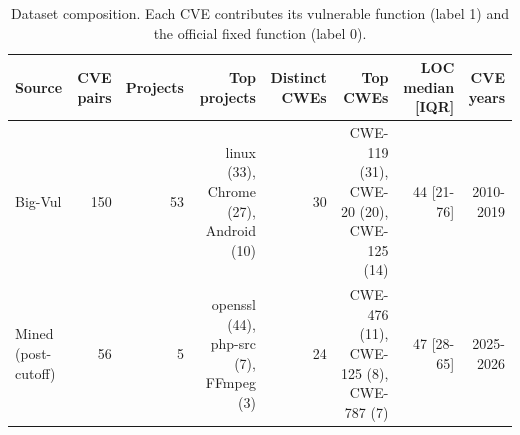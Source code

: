 \begin{table}[t]
\centering\small
\caption{Dataset composition. Each CVE contributes its vulnerable function (label 1) and the official fixed function (label 0).}
\label{tab:t1}
\begin{tabular}{lrrrrrrr}
\toprule
Source & CVE pairs & Projects & Top projects & Distinct CWEs & Top CWEs & LOC median [IQR] & CVE years \\
\midrule
Big-Vul & 150 & 53 & linux (33), Chrome (27), Android (10) & 30 & CWE-119 (31), CWE-20 (20), CWE-125 (14) & 44 [21-76] & 2010-2019 \\
Mined (post-cutoff) & 56 & 5 & openssl (44), php-src (7), FFmpeg (3) & 24 & CWE-476 (11), CWE-125 (8), CWE-787 (7) & 47 [28-65] & 2025-2026 \\
\bottomrule
\end{tabular}
\end{table}

